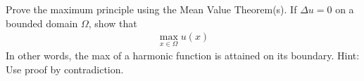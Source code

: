 \item Prove the maximum principle using the Mean Value Theorem(s). If $\Delta u = 0$ on a bounded domain $\Omega$, show that
%
\begin{align}
  \max_{x \in \Omega} u(x)
\end{align}
In other words, the max of a harmonic function is attained on its boundary. Hint: Use proof by contradiction.
